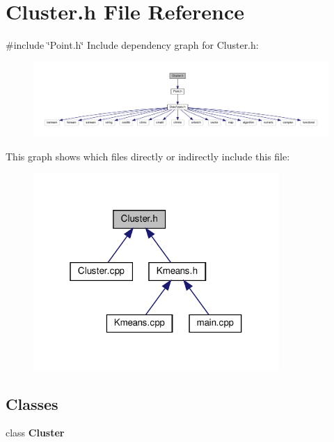 \section{Cluster.\+h File Reference}
\label{_cluster_8h}
{\ttfamily \#include \char`\"{}Point.\+h\char`\"{}}\newline
Include dependency graph for Cluster.\+h\+:\nopagebreak
\begin{figure}[H]
\begin{center}
\leavevmode
\includegraphics[width=350pt]{_cluster_8h__incl}
\end{center}
\end{figure}
This graph shows which files directly or indirectly include this file\+:\nopagebreak
\begin{figure}[H]
\begin{center}
\leavevmode
\includegraphics[width=265pt]{_cluster_8h__dep__incl}
\end{center}
\end{figure}
\subsection*{Classes}
\begin{DoxyCompactItemize}
\item 
class \textbf{ Cluster}
\end{DoxyCompactItemize}
